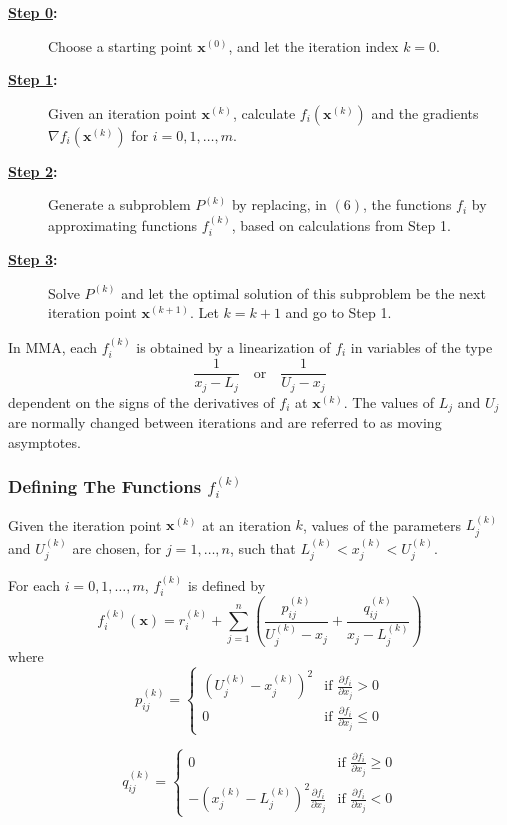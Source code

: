 \begin{description}
	\item[\textbf{\underline{Step 0}:}] Choose a starting point $\mathbf{x}^{(0)}$, and let the iteration index $k=0$.
	\item[\textbf{\underline{Step 1}:}] Given an iteration point $\mathbf{x}^{(k)}$, calculate $f_i(\mathbf{x}^{(k)})$ and the gradients $\nabla f_i(\mathbf{x}^{(k)})$ for $i=0,1,\ldots,m$.
	\item[\textbf{\underline{Step 2}:}] Generate a subproblem $P^{(k)}$ by replacing, in $(6)$, the functions $f_i$ by approximating functions $f_i^{(k)}$, based on calculations from Step 1.
	\item[\textbf{\underline{Step 3}:}] Solve $P^{(k)}$ and let the optimal solution of this subproblem be the next iteration point $\mathbf{x}^{(k+1)}$. Let $k=k+1$ and go to Step 1.
\end{description}

In MMA, each $f_i^{(k)}$ is obtained by a linearization of $f_i$ in variables of the type $$\frac{1}{x_j-L_j}\quad\text{or}\quad\frac{1}{U_j-x_j}$$ dependent on the signs of the derivatives of $f_i$ at $\mathbf{x}^{(k)}$. The values of $L_j$ and $U_j$ are normally changed between iterations and are referred to as moving asymptotes.

\subsubsection*{Defining The Functions $f_i^{(k)}$}

Given the iteration point $\mathbf{x}^{(k)}$ at an iteration $k$, values of the parameters $L_j^{(k)}$ and $U_j^{(k)}$ are chosen, for $j=1,\ldots,n$, such that $L_j^{(k)}<x_j^{(k)}<U_j^{(k)}$.


For each $i=0,1,\ldots,m$, $f_i^{(k)}$ is defined by $$f_i^{(k)}(\mathbf{x})=r_i^{(k)}+\sum\limits_{j=1}^{n}\left(\frac{p_{ij}^{(k)}}{U_j^{(k)}-x_j}+\frac{q_{ij}^{(k)}}{x_j-L_j^{(k)}}\right)$$
where
$$p_{ij}^{(k)}=\begin{cases}
\left(U_j^{(k)}-x_j^{(k)}\right)^2 & \text{if }\frac{\partial f_i}{\partial x_j}>0\\
0 & \text{if }\frac{\partial f_i}{\partial x_j}\leq 0
\end{cases}$$
	
$$q_{ij}^{(k)}=\begin{cases}
0 & \text{if }\frac{\partial f_i}{\partial x_j}\geq 0\\
-\left(x_j^{(k)}-L_j^{(k)}\right)^2\frac{\partial f_i}{\partial x_j} & \text{if }\frac{\partial f_i}{\partial x_j}<0
\end{cases}$$
	
